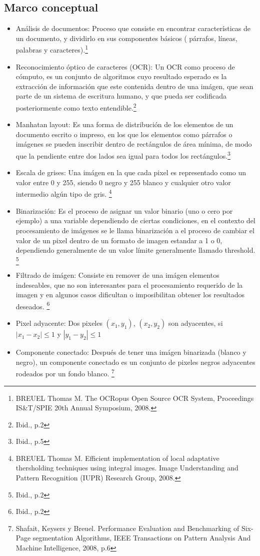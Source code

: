 \documentclass[a4paper, 11pt, oneside]{article}
\begin{document}
	\subsection{Marco conceptual}
	\begin{itemize}
    \item Análisis de documentos: Proceso que consiste en encontrar características de un documento,
    y dividirlo en sus componentes básicos ( párrafos, líneas, palabras y caracteres).\footnote{
	BREUEL Thomas M. The OCRopus Open Source OCR System, Proceedings IS\&T/SPIE 20th Annual Symposium, 2008.}
    \item Reconocimiento óptico de caracteres (OCR): Un OCR como proceso de cómputo, es un conjunto de
    algoritmos cuyo resultado esperado es la extracción de información  que este contenida dentro de
    una imágen, que sean parte de un sistema de escritura humano, y que pueda ser codificada
    posteriormente como texto entendible.\footnote{Ibid., p.2}
    \item Manhatan layout: Es una forma de distribución de los elementos de un documento escrito o
    impreso, en los que los elementos como párrafos o imágenes se pueden inscribir
    dentro de rectángulos de área mínima, de modo que la pendiente entre dos lados sea igual para
    todos los rectángulos.\footnote{Ibid., p.5}
    \item Escala de grises: Una imágen en la que cada pixel es representado como un valor entre 0 y
    255, siendo 0 negro y 255 blanco y cualquier otro valor intermedio algún tipo de gris. \footnote{
    BREUEL Thomas M. Efficient implementation of local adaptative thersholding techniques using integral 
    images. Image Understanding and Pattern Recognition (IUPR) Research Group, 2008.}
    \item Binarización:	Es el proceso de asignar un valor binario (uno o cero por ejemplo) a una
    variable dependiendo de	ciertas condiciones, en el contexto del procesamiento de imágenes se le
    llama binarización a el proceso de cambiar el valor de un pixel dentro de un formato de imagen
    estandar a 1 o 0, dependiendo generalmente de un valor límite generalmente llamado threshold.
    \footnote{Ibid., p.2}
    \item Filtrado de imágen: Consiste en remover de una imágen elementos indeseables, que no
    son interesantes para el procesamiento requerido de la imagen y en algunos casos dificultan
    o imposibilitan obtener los resultados deseados.
    \footnote{Ibid., p.2}
    \item Pixel adyacente: Dos pixeles $(x_1,y_1)$, $(x_2,y_2)$ son adyacentes, si $|x_1-x_2| \le 1$
    y $|y_1-y_2| \le 1$
    \item Componente conectado: Después de tener una imágen binarizada (blanco y negro), un
    componente conectado es un conjunto de pixeles negros adyacentes rodeados por un fondo blanco.
    \footnote{Shafait, Keysers y Breuel. Performance Evaluation and Benchmarking of Six-Page segmentation
    Algorithms, IEEE Transactions on Pattern Analysis And Machine Intelligence, 2008, p.6}
   
	\end{itemize}
	
\end{document}
